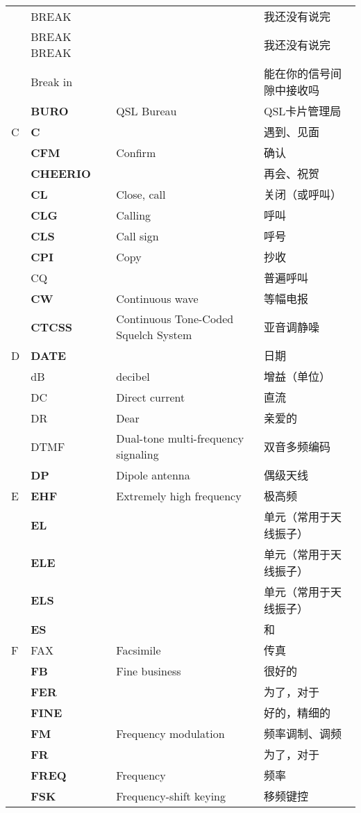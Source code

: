 \begin{longtable}[l]{llll}
& BREAK & & 我还没有说完 \\
& BREAK BREAK & & 我还没有说完 \\
& Break in & & 能在你的信号间隙中接收吗 \\
& \textbf{BURO} & QSL Bureau & QSL卡片管理局 \\
C & \textbf{C} & & 遇到、见面 \\
& \textbf{CFM} & Confirm & 确认 \\
& \textbf{CHEERIO} & & 再会、祝贺 \\
& \textbf{CL} & Close, call & 关闭（或呼叫） \\
& \textbf{CLG} & Calling & 呼叫 \\
& \textbf{CLS} & Call sign & 呼号 \\
& \textbf{CPI} & Copy & 抄收 \\
& CQ & & 普遍呼叫 \\
& \textbf{CW} & Continuous wave & 等幅电报 \\
& \textbf{CTCSS} & Continuous Tone-Coded Squelch System & 亚音调静噪 \\
D & \textbf{DATE} & & 日期 \\
& dB & decibel & 增益（单位） \\
& DC & Direct current & 直流 \\
& DR & Dear & 亲爱的 \\
& DTMF & Dual-tone multi-frequency signaling & 双音多频编码 \\
& \textbf{DP} & Dipole antenna & 偶级天线 \\
E & \textbf{EHF} & Extremely high frequency & 极高频 \\
& \textbf{EL} & & 单元（常用于天线振子） \\
& \textbf{ELE} & & 单元（常用于天线振子） \\
& \textbf{ELS} & & 单元（常用于天线振子） \\
& \textbf{ES} & & 和 \\
F & FAX & Facsimile & 传真 \\
& \textbf{FB} & Fine business & 很好的 \\
& \textbf{FER} & & 为了，对于 \\
& \textbf{FINE} & & 好的，精细的 \\
& \textbf{FM} & Frequency modulation & 频率调制、调频 \\
& \textbf{FR} & & 为了，对于 \\
& \textbf{FREQ} & Frequency & 频率 \\
& \textbf{FSK} & Frequency-shift keying & 移频键控 \\

\end{longtable}
